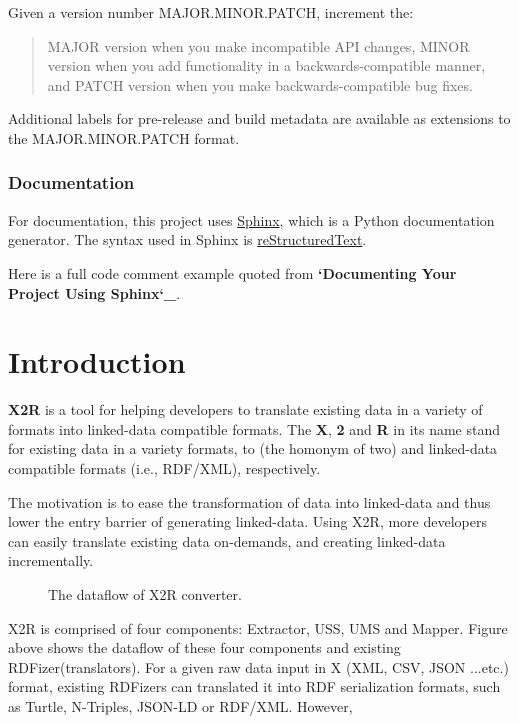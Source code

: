 \documentclass[letterpaper,10pt,english]{sphinxmanual}
\begin{document}
Given a version number MAJOR.MINOR.PATCH, increment the:
\begin{quote}

MAJOR version when you make incompatible API changes,
MINOR version when you add functionality in a backwards-compatible manner, and
PATCH version when you make backwards-compatible bug fixes.
\end{quote}

Additional labels for pre-release and build metadata are available as extensions to the MAJOR.MINOR.PATCH format.


\subsection{Documentation}
\label{docs/convensions:documentation}
For documentation, this project uses \href{http://sphinx-doc.org/}{Sphinx}, which is a Python documentation generator.
The syntax used in Sphinx is \href{http://docutils.sourceforge.net/rst.html}{reStructuredText}.

Here is a full code comment example quoted from {\color{red}\bfseries{}{}`Documenting Your Project Using Sphinx{}`\_}.


\chapter{Introduction}
\label{index:introduction}
\textbf{X2R} is a tool for helping developers to translate existing data in a variety of formats into linked-data compatible formats. The \textbf{X}, \textbf{2} and \textbf{R} in its name stand for existing data in a variety formats, to (the homonym of two) and linked-data compatible formats (i.e., RDF/XML), respectively.

The motivation is to ease the transformation of data into linked-data and thus lower the entry barrier of generating linked-data. Using X2R, more developers can easily translate existing data on-demands, and creating linked-data incrementally.
\begin{figure}[htbp]
\centering
\capstart

\caption{The dataflow of X2R converter.}\end{figure}

X2R is comprised of four components: Extractor, USS, UMS and Mapper. Figure above shows the dataflow of these four components and existing RDFizer(translators). For a given raw data input in X (XML, CSV, JSON ...etc.) format, existing RDFizers can translated it into RDF serialization formats, such as Turtle, N-Triples, JSON-LD or RDF/XML. However,
\end{document}
